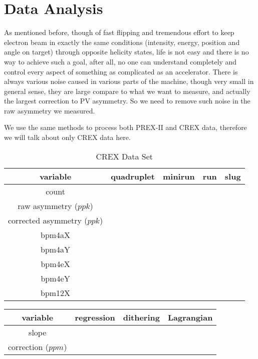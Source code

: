 \chapter{Data Analysis}
As mentioned before, though of fast flipping and tremendous effort to keep electron beam in exactly
the same conditions (intensity, energy, position and angle on target) through 
opposite helicity states, life is not easy and there is no way to achieve such
a goal, after all, no one can understand completely and control every aspect of
something as complicated as an accelerator. There is always various noise caused
in various parts of the machine, though very small in general sense, they are
large compare to what we want to measure, and actually the largest correction
to PV asymmetry. So we need to remove such noise in the raw asymmetry we measured.

We use the same methods to process both PREX-II and CREX data, therefore we will
talk about only CREX data here.

\begin{table}
    \begin{tabular}{c | c c c c }
	\hline
	variable    & quadruplet    & minirun	& run	& slug	\\
	\hline
	count	    &	&   &	&   \\
	raw asymmetry ($ppk$)	&   \\
	corrected asymmetry ($ppk$)	&   \\
	\hline
	bpm4aX	\\
	bpm4aY	\\
	bpm4eX	\\
	bpm4eY	\\
	bpm12X	\\
	\hline
    \end{tabular}
    \caption{CREX Data Set}
\end{table}

\begin{table}
    \begin{tabular}{c | c c c}
	\hline
	variable    & regression    & dithering	    & Lagrangian    \\
	\hline
	slope	\\
	correction ($ppm$)  \\
	\hline
    \end{tabular}
\end{table}

